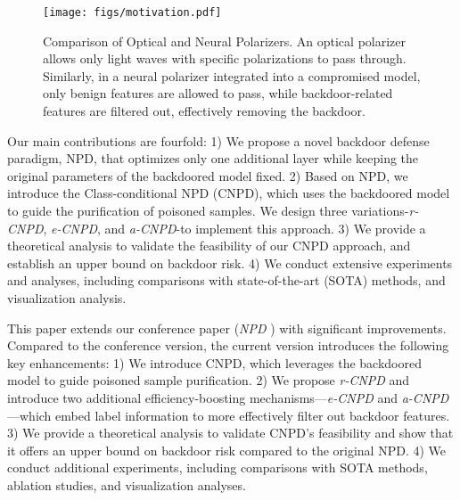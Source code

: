 \begin{figure}
\centering
\vspace{0.5em}
\texttt{[image: figs/motivation.pdf]}
\caption{Comparison of Optical and Neural Polarizers. An optical polarizer allows only light waves with specific polarizations to pass through. Similarly, in a neural polarizer integrated into a compromised model, only benign features are allowed to pass, while backdoor-related features are filtered out, effectively removing the backdoor.}
\label{motivation}
\end{figure}


Our main contributions are fourfold:
1) We propose a novel backdoor defense paradigm, NPD, that optimizes only one additional layer while keeping the original parameters of the backdoored model fixed.
2) Based on NPD, we introduce the Class-conditional NPD (CNPD), which uses the backdoored model to guide the purification of poisoned samples. We design three variations-\textit{r-CNPD}, \textit{e-CNPD}, and \textit{a-CNPD}-to implement this approach.
3) We provide a theoretical analysis to validate the feasibility of our CNPD approach, and establish an upper bound on backdoor risk.
4) We conduct extensive experiments and analyses, including comparisons with state-of-the-art (SOTA) methods, and visualization analysis.


This paper extends our conference paper (\textit{NPD} \cite{zhu2024neural}) with significant improvements. Compared to the conference version, the current version introduces the following key enhancements:
1) We introduce CNPD, which leverages the backdoored model to guide poisoned sample purification.  
2) We propose \textit{r-CNPD} and introduce two additional efficiency-boosting mechanisms—\textit{e-CNPD}  and \textit{a-CNPD} —which embed label information to more effectively filter out backdoor features.
3) We provide a theoretical analysis to validate CNPD’s feasibility and show that it offers an upper bound on backdoor risk compared to the original NPD.  
4) We conduct additional experiments, including comparisons with SOTA methods, ablation studies, and visualization analyses.






